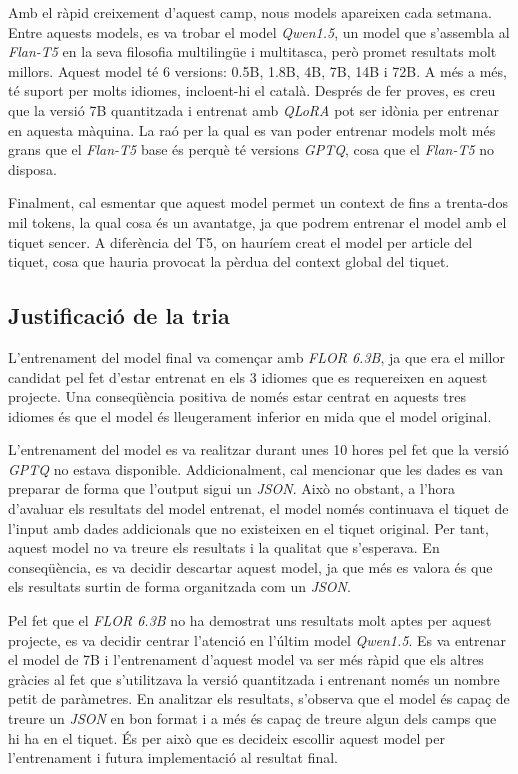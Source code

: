 Amb el ràpid creixement d'aquest camp, nous models apareixen cada setmana. Entre aquests models, es va trobar el model \textit{Qwen1.5}, un model que s'assembla al \textit{Flan-T5} en la seva filosofia multilingüe i multitasca, però promet resultats molt millors. Aquest model té 6 versions: 0.5B, 1.8B, 4B, 7B, 14B i 72B. A més a més, té suport per molts idiomes, incloent-hi el català. Després de fer proves, es creu que la versió 7B quantitzada i entrenat amb \textit{QLoRA} pot ser idònia per entrenar en aquesta màquina. La raó per la qual es van poder entrenar models molt més grans que el \textit{Flan-T5} base és perquè té versions \textit{GPTQ}, cosa que el \textit{Flan-T5} no disposa.

Finalment, cal esmentar que aquest model permet un context de fins a trenta-dos mil tokens, la qual cosa és un avantatge, ja que podrem entrenar el model amb el tiquet sencer. A diferència del T5, on hauríem creat el model per article del tiquet, cosa que hauria provocat la pèrdua del context global del tiquet.

\subsection{Justificació de la tria}

L'entrenament del model final va començar amb \textit{FLOR 6.3B}, ja que era el millor candidat pel fet d'estar entrenat en els 3 idiomes que es requereixen en aquest projecte. Una conseqüència positiva de només estar centrat en aquests tres idiomes és que el model és lleugerament inferior en mida que el model original.

L'entrenament del model es va realitzar durant unes 10 hores pel fet que la versió \textit{GPTQ} no estava disponible. Addicionalment, cal mencionar que les dades es van preparar de forma que l'output sigui un \textit{JSON}. Això no obstant, a l'hora d'avaluar els resultats del model entrenat, el model només continuava el tiquet de l'input amb dades addicionals que no existeixen en el tiquet original. Per tant, aquest model no va treure els resultats i la qualitat que s'esperava. En conseqüència, es va decidir descartar aquest model, ja que més es valora és que els resultats surtin de forma organitzada com un \textit{JSON}.

Pel fet que el \textit{FLOR 6.3B} no ha demostrat uns resultats molt aptes per aquest projecte, es va decidir centrar l'atenció en l'últim model \textit{Qwen1.5}. Es va entrenar el model de 7B i l'entrenament d'aquest model va ser més ràpid que els altres gràcies al fet que s'utilitzava la versió quantitzada i entrenant només un nombre petit de paràmetres. En analitzar els resultats, s'observa que el model és capaç de treure un \textit{JSON} en bon format i a més és capaç de treure algun dels camps que hi ha en el tiquet. És per això que es decideix escollir aquest model per l'entrenament i futura implementació al resultat final.

